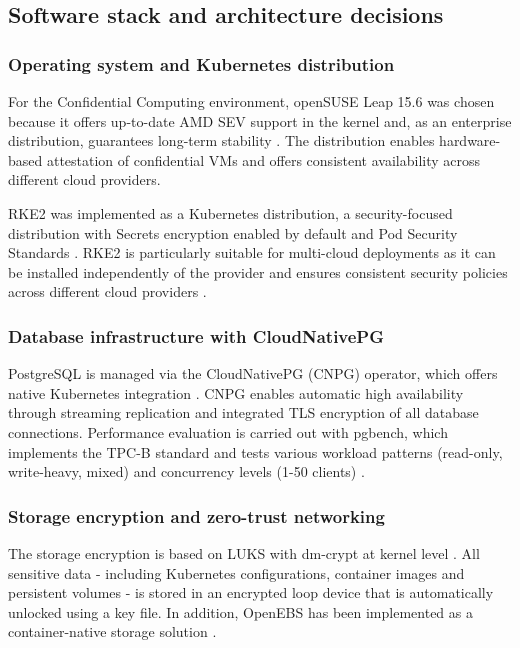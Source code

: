 \subsection{Software stack and architecture decisions}

\subsubsection{Operating system and Kubernetes distribution}

For the Confidential Computing environment, openSUSE Leap 15.6 was chosen because it offers up-to-date AMD SEV support in the kernel and, as an enterprise distribution, guarantees long-term stability \parencite{amd_sev_2024}. The distribution enables hardware-based attestation of confidential VMs and offers consistent availability across different cloud providers.

RKE2 was implemented as a Kubernetes distribution, a security-focused distribution with Secrets encryption enabled by default and Pod Security Standards \parencite{rke2_docs_2025, kubernetes_security_2025}. RKE2 is particularly suitable for multi-cloud deployments as it can be installed independently of the provider and ensures consistent security policies across different cloud providers \parencite{cncf_security_2024}.

\subsubsection{Database infrastructure with CloudNativePG}

PostgreSQL is managed via the CloudNativePG (CNPG) operator, which offers native Kubernetes integration \parencite{cnpg_docs_2025}. CNPG enables automatic high availability through streaming replication and integrated TLS encryption of all database connections. Performance evaluation is carried out with pgbench, which implements the TPC-B standard and tests various workload patterns (read-only, write-heavy, mixed) and concurrency levels (1-50 clients) \parencite{pgbench_docs_2024, tpc_b_2024, postgresql_17_2024}.

\subsubsection{Storage encryption and zero-trust networking}

The storage encryption is based on LUKS with dm-crypt at kernel level \parencite{fruhwirth_luks_2005, luks2_spec_2024}. All sensitive data - including Kubernetes configurations, container images and persistent volumes - is stored in an encrypted loop device that is automatically unlocked using a key file. In addition, OpenEBS has been implemented as a container-native storage solution \parencite{openebs_docs_2025}.

